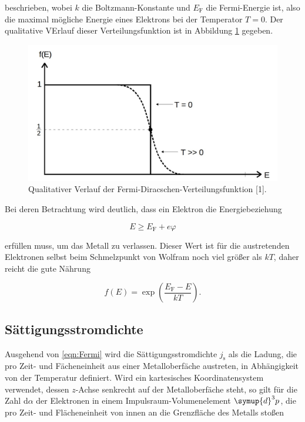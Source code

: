 beschrieben, wobei $k$ die Boltzmann-Konstante und $E_\text{F}$ die Fermi-Energie 
ist, also die maximal mögliche Energie eines Elektrons bei der Temperator $T=0$.
Der qualitative VErlauf dieser Verteilungsfunktion ist in Abbildung \ref{fig:Fermi} gegeben. 

\begin{figure}
  \centering
  \includegraphics[scale=0.2]{content/Fermi.jpg}
  \caption{Qualitativer Verlauf der Fermi-Diracschen-Verteilungsfunktion [1].}
  \label{fig:Fermi}
\end{figure}

Bei deren Betrachtung wird deutlich, dass ein Elektron die Energiebeziehung 

\begin{equation}
E \geq E_\text{F} + e\varphi
\label{eqn:Austritt}
\end{equation}

erfüllen muss, um das Metall zu verlassen. Dieser Wert ist für die austretenden 
Elektronen selbst beim Schmelzpunkt von Wolfram noch viel größer als $kT$, daher
reicht die gute Nährung

\begin{equation}
f(E) = \exp{\left(\frac{E_\text{F}-E}{kT}\right)}.
\label{eqn:Fermi}
\end{equation}

\subsection{Sättigungsstromdichte}

Ausgehend von \eqref{eqn:Fermi} wird die Sättigungsstromdichte $j_\text{s}$ 
als die Ladung, die pro Zeit- und Fächeneinheit aus einer Metalloberfäche austreten,
in Abhängigkeit von der Temperatur definiert. Wird ein kartesisches Koordinatensystem 
verwendet, dessen $z$-Achse senkrecht auf der Metalloberfäche steht, so gilt 
für die Zahl d$\alpha$ der Elektronen in einem Impulsraum-Volumenelement $\symup{d}^3p$,
die pro Zeit- und Flächeneinheit von innen an die Grenzfläche des Metalls 
stoßen

